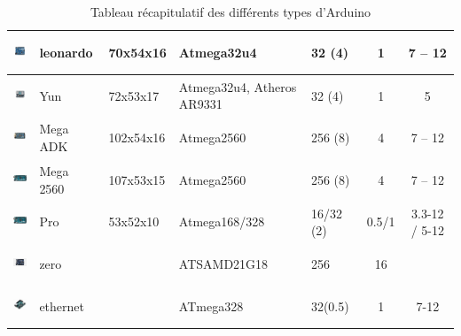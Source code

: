 \documentclass[12pt, openany]{report}
\begin{document}
\begin{table}[!h]
\begin{tabular}{|p{}|p{}|p{2cm}|p{3cm}|p{2cm}|c|c||}
\hline  \includegraphics[height=1cm,width=1cm]{arduino_gamme/leonardo.png} & leonardo & 70x54x16 & Atmega32u4 & 32 (4)&
1 & 7 – 12 \\
\hline  \includegraphics[height=1cm,width=1cm]{arduino_gamme/yun.png}  & Yun &  72x53x17 &
Atmega32u4,
 Atheros
  AR9331  &
32 (4) &
1 &
5  \\
\hline  \includegraphics[height=1cm,width=1cm]{arduino_gamme/megaadk.jpg}& Mega ADK & 102x54x16 &
Atmega2560 &
256 (8) &
4 &
7 – 12  \\
\hline  \includegraphics[height=1cm,width=1cm]{arduino_gamme/mega2560.jpg} & Mega 2560 &
107x53x15 &
Atmega2560 &
256 (8) &
4 &
7 – 12  \\

\hline  \includegraphics[height=1cm,width=1cm]{arduino_gamme/mega2560.jpg} &  Pro &
53x52x10 &
Atmega168/328 &
16/32 (2) &
0.5/1  &
3.3-12 / 5-12    \\
\hline  \includegraphics[height=1cm,width=1cm]{arduino_gamme/zero.jpg}& zero & &
ATSAMD21G18 &
256 &
16   \\
\hline  \includegraphics[height=1cm,width=1cm]{arduino_gamme/ethernet.jpg}& ethernet & &
ATmega328 &
32(0.5) &
1 &
7-12   \\
\hline
\end{tabular}
\newline

\caption{Tableau récapitulatif des différents types d'Arduino}
\end{table}         		          	
	
\end{document}
